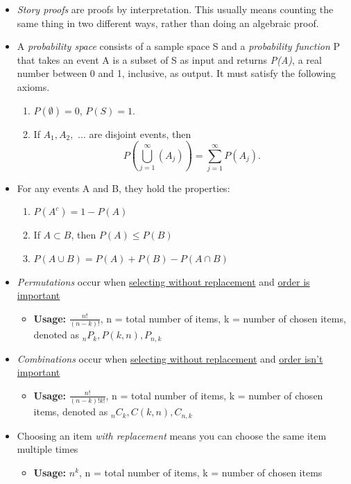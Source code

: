\documentclass[12pt, letterpaper]{article}
\begin{document}
\begin{itemize}
    \item \textit{Story proofs} are proofs by interpretation. This usually means counting the same thing in two different ways, rather than doing an algebraic proof.
    \item A \textit{probability space} consists of a sample space S and a \textit{probability function} P that takes an event A is a subset of S as input and returns \textit{P(A)}, a real number between 0 and 1, inclusive, as output. It must satisfy the following axioms.
    \begin{enumerate}
        \item \(P(\emptyset) = 0\), \(P(S) = 1\).
        \item If \(A_{1}, A_{2},\) ... are disjoint events, then \[P(\bigcup\limits_{j=1}^{\infty}(A_{j})) = \sum\limits_{j=1}^{\infty}P(A_{j}).\]
    \end{enumerate}
    \item For any events A and B, they hold the properties:
    \begin{enumerate}
        \item \(P(A^{c}) = 1 - P(A) \)
        \item If \(A \subset B \), then \(P(A) \leq P(B) \)
        \item \(P(A \cup B) = P(A) + P(B) - P(A \cap B) \)
    \end{enumerate}
    \item \textit{Permutations} occur when \underline{selecting without replacement} and \underline{order is important}
    \begin{itemize}
        \item \textbf{Usage: }\(\frac{n!}{(n - k)!} \), n = total number of items, k = number of chosen items, denoted as \(_{n}P_{k}, P(k, n), P_{n, k}\)
    \end{itemize}
    \item \textit{Combinations} occur when \underline{selecting without replacement} and \underline{order isn't important}
    \begin{itemize}
        \item \textbf{Usage: }\(\frac{n!}{(n - k)!k!} \), n = total number of items, k = number of chosen items, denoted as \(_{n}C_{k}, C(k, n), C_{n, k}  \)
    \end{itemize}
    \item Choosing an item \textit{with replacement} means you can choose the same item multiple times
    \begin{itemize}
        \item \textbf{Usage: }\(n^{k}\), n = total number of items, k = number of chosen items
    \end{itemize}
\end{itemize}
\end{document}
